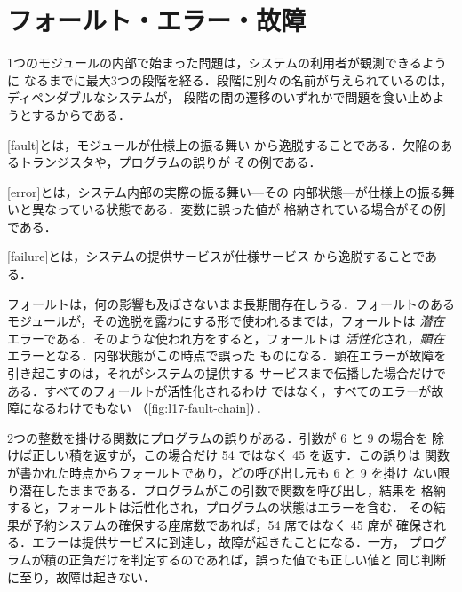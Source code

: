 \documentclass[../main.tex]{subfiles}
\begin{document}
\section{フォールト・エラー・故障}
\label{sec:l17-fault-error-failure}

1つのモジュールの内部で始まった問題は，システムの利用者が観測できるように
なるまでに最大3つの段階を経る．段階に別々の名前が与えられているのは，ディペンダブルなシステムが，
段階の間の遷移のいずれかで問題を食い止めようとするからである．

\begin{definition}
  \label{def:l17-fault-error-failure}
  [fault]とは，モジュールが仕様上の振る舞い
  から逸脱することである．欠陥のあるトランジスタや，プログラムの誤りが
  その例である．

  [error]とは，システム内部の実際の振る舞い---その
  内部状態---が仕様上の振る舞いと異なっている状態である．変数に誤った値が
  格納されている場合がその例である．

  [failure]とは，システムの提供サービスが仕様サービス
  から逸脱することである．
\end{definition}

フォールトは，何の影響も及ぼさないまま長期間存在しうる．フォールトのある
モジュールが，その逸脱を露わにする形で使われるまでは，フォールトは
\emph{潜在}エラーである．そのような使われ方をすると，フォールトは
\emph{活性化}され，\emph{顕在}エラーとなる．内部状態がこの時点で誤った
ものになる．顕在エラーが故障を引き起こすのは，それがシステムの提供する
サービスまで伝播した場合だけである．すべてのフォールトが活性化されるわけ
ではなく，すべてのエラーが故障になるわけでもない
（\cref{fig:l17-fault-chain}）．

\begin{example}
  \label{ex:l17-fault-chain}
  2つの整数を掛ける関数にプログラムの誤りがある．引数が 6 と 9 の場合を
  除けば正しい積を返すが，この場合だけ 54 ではなく 45 を返す．この誤りは
  関数が書かれた時点からフォールトであり，どの呼び出し元も 6 と 9 を掛け
  ない限り潜在したままである．プログラムがこの引数で関数を呼び出し，結果を
  格納すると，フォールトは活性化され，プログラムの状態はエラーを含む．
  その結果が予約システムの確保する座席数であれば，54 席ではなく 45 席が
  確保される．エラーは提供サービスに到達し，故障が起きたことになる．一方，
  プログラムが積の正負だけを判定するのであれば，誤った値でも正しい値と
  同じ判断に至り，故障は起きない．
\end{example}
\end{document}
